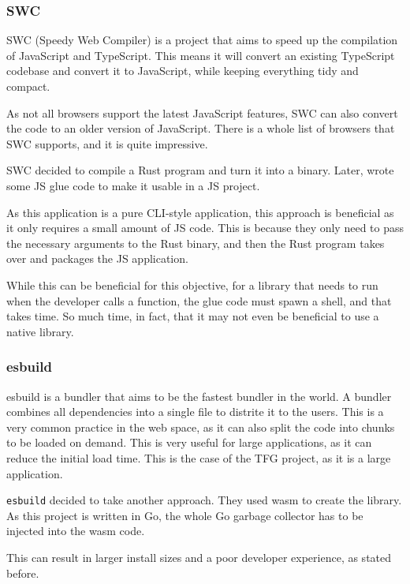\documentclass[10pt,journal,compsoc]{IEEEtran}
\begin{document}
\subsubsection{SWC}

SWC (Speedy Web Compiler) is a project that aims to speed up the compilation of JavaScript and TypeScript. This means it will convert an existing TypeScript codebase and convert it to JavaScript, while keeping everything tidy and compact.

As not all browsers support the latest JavaScript features, SWC can also convert the code to an older version of JavaScript. There is a whole list of browsers that SWC supports, and it is quite impressive.

SWC decided to compile a Rust program and turn it into a binary. Later, wrote some JS glue code to make it usable in a JS project.

As this application is a pure CLI-style application, this approach is beneficial as it only requires a small amount of JS code. This is because they only need to pass the necessary arguments to the Rust binary, and then the Rust program takes over and packages the JS application.

While this can be beneficial for this objective, for a library that needs to run when the developer calls a function, the glue code must spawn a shell, and that takes time. So much time, in fact, that it may not even be beneficial to use a native library.

\subsubsection{esbuild}

esbuild is a bundler \cite{Bundler} that aims to be the fastest bundler in the world. A bundler combines all dependencies into a single file to distrite it to the users. This is a very common practice in the web space, as it can also split the code into chunks to be loaded on demand. This is very useful for large applications, as it can reduce the initial load time. This is the case of the TFG \cite{TFG} project, as it is a large application.

\verb|esbuild| decided to take another approach. They used wasm \cite{WASM} to create the library. As this project is written in Go, the whole Go garbage collector has to be injected into the wasm code.

This can result in larger install sizes and a poor developer experience, as stated before.
\end{document}
